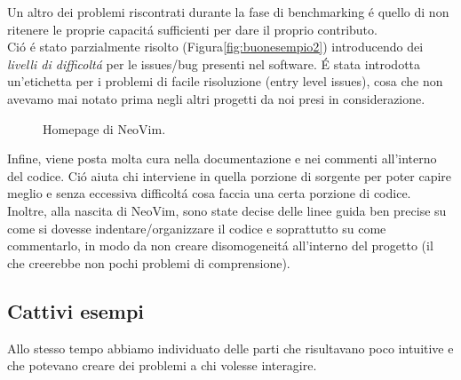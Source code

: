 \documentclass[12pt]{article} %
\begin{document}
Un altro dei problemi riscontrati durante la fase di benchmarking \'e quello di non ritenere le proprie capacit\'a sufficienti per dare il proprio contributo.\\
Ci\'o \'e stato parzialmente risolto (Figura\ref{fig:buonesempio2}) introducendo dei \emph{livelli di difficolt\'a} per le issues/bug presenti nel software. \'E stata introdotta un'etichetta per i problemi di facile risoluzione (entry level issues), cosa che non avevamo mai notato prima negli altri progetti da noi presi in considerazione.

\begin{figure}[H]
\caption{Homepage di NeoVim.}
\label{fig:buonesempio3}
\end{figure}

Infine, viene posta molta cura nella documentazione e nei commenti all'interno del codice. Ci\'o aiuta chi interviene in quella porzione di sorgente per poter capire meglio e senza eccessiva difficolt\'a cosa faccia una certa porzione di codice.\\
Inoltre, alla nascita di NeoVim, sono state decise delle linee guida ben precise su come si dovesse indentare/organizzare il codice e soprattutto su come commentarlo, in modo da non creare disomogeneit\'a all'interno del progetto (il che creerebbe non pochi problemi di comprensione).\\

\subsection{Cattivi esempi}
\label{badexamples}
Allo stesso tempo abbiamo individuato delle parti che risultavano poco intuitive e che potevano creare dei problemi a chi volesse interagire.
\end{document}
